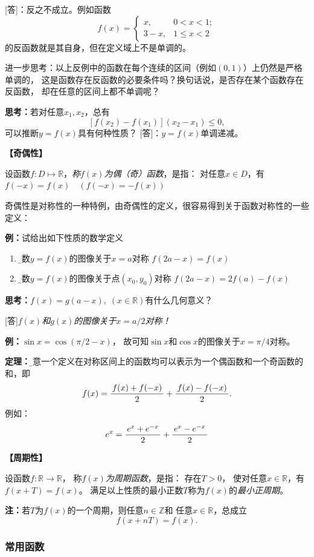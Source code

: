 [答]：反之不成立。例如函数
$$f(x)=\left\{\begin{array}{ll}
	x,&0<x<1;\\
	3-x,&1\leq x<2
\end{array}\right.$$
的反函数就是其自身，但在定义域上不是单调的。

进一步思考：以上反例中的函数在每个连续的区间（例如$(0,1)$）上仍然是严格单调的，
这是函数存在反函数的必要条件吗？换句话说，是否存在某个函数存在反函数，
却在任意的区间上都不单调呢？

{\b {\bf 思考：}若对任意$x_1,x_2$，总有
$$[f(x_2)-f(x_1)](x_2-x_1)\leq 0,$$
可以推断$y=f(x)$具有何种性质？}
[答]：$y=f(x)$单调递减。

{\bf 【奇偶性】}

	设函数$f:D\mapsto\mathbb{R}$，{\it 称$f(x)$为偶（奇）函数}，是指：
	对任意$x\in D$，有$f(-x)=f(x)\quad(f(-x)=-f(x))$

奇偶性是对称性的一种特例，由奇偶性的定义，很容易得到关于函数对称性的一些定义：

{\bf 例：}试给出如下性质的数学定义
\begin{enumerate}[(1)]
  \setlength{\itemindent}{1cm}
  \item {\b 函数$y=f(x)$的图像关于$x=a$对称
  \dotfill$f(2a-x)=f(x)$}
  \item {\b 函数$y=f(x)$的图像关于点$(x_0,y_0)$对称
  \dotfill $f(2a-x)=2f(a)-f(x)$}
\end{enumerate}

{\b {\bf 思考：}$f(x)=g(a-x),\;(x\in\mathbb{R})$有什么几何意义？

[答]{\it $f(x)$和$g(x)$的图像关于$x=a/2$对称！}}

{\bf 例：}$\sin x=\cos(\pi/2-x)$，
故可知$\sin x$和$\cos x$的图像关于$x=\pi/4$对称。

{\bf 定理：}{\b 任意一个定义在对称区间上的函数均可以表示为一个偶函数和一个奇函数的和}，即
$$f(x)=\displaystyle\frac{\,{f(x)+f(-x)}\,}{\,{2}\,}+\displaystyle\frac{\,{f(x)-f(-x)}\,}{\,{2}\,}.$$
例如：
$$e^x=\displaystyle\frac{\,{e^x+e^{-x}}\,}{\,{2}\,}+\displaystyle\frac{\,{e^x-e^{-x}}\,}{\,{2}\,}$$

{\bf 【周期性】}

设函数$f:\mathbb{R}\to\mathbb{R}$，
称{\it $f(x)$为周期函数}，是指： 存在$T>0$，
使对任意$x\in\mathbb{R}$，有
$f(x+T)=f(x)$。
满足以上性质的最小正数$T$称为$f(x)$的{\it 最小正周期}。
		 
{\bf 注：}若$T$为$f(x)$的一个周期，则任意$n\in\mathbb{Z}$和
任意$x\in\mathbb{R}$，总成立
$$f(x+nT)=f(x).$$

\subsubsection{常用函数}

